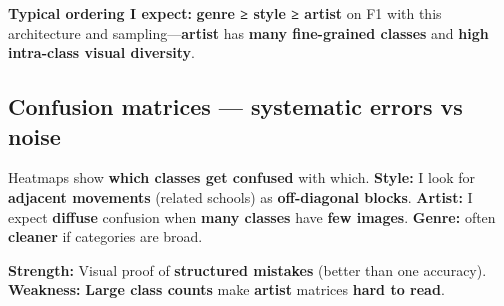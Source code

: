 \documentclass[11pt]{article}
\begin{document}
\textbf{Typical ordering I expect:} \textbf{genre ≥ style ≥ artist} on
F1 with this architecture and sampling---\textbf{artist} has
\textbf{many fine-grained classes} and \textbf{high intra-class visual
diversity}.

    \subsection{Confusion matrices --- systematic errors vs
noise}\label{confusion-matrices-systematic-errors-vs-noise}

Heatmaps show \textbf{which classes get confused} with which.
\textbf{Style:} I look for \textbf{adjacent movements} (related schools)
as \textbf{off-diagonal blocks}. \textbf{Artist:} I expect
\textbf{diffuse} confusion when \textbf{many classes} have \textbf{few
images}. \textbf{Genre:} often \textbf{cleaner} if categories are broad.

\textbf{Strength:} Visual proof of \textbf{structured mistakes} (better
than one accuracy). \textbf{Weakness:} \textbf{Large class counts} make
\textbf{artist} matrices \textbf{hard to read}.
\end{document}
